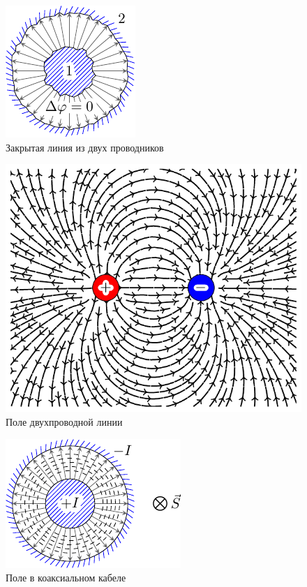 \begin{figure}[H]
	\centering
	\includegraphics[scale=1.5]{img/lect4_ris4}
	\caption{Закрытая линия из двух проводников}
	\label{fig:lect4:4}
\end{figure}

\begin{figure}[H]
	\centering
	\includegraphics[scale=0.7]{img/lect4_ris5}
	\caption{Поле двухпроводной линии}
	\label{fig:lect4:5}
\end{figure}

\begin{figure}[H]
	\centering
	\includegraphics[scale=1.5]{img/lect4_ris6}
	\caption{Поле в коаксиальном кабеле}
	\label{fig:lect4:6}
\end{figure}
